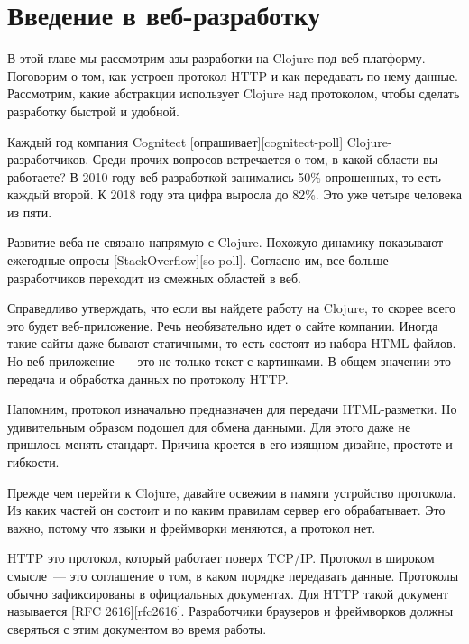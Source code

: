 
\chapter{Введение в веб-разработку}

В этой главе мы рассмотрим азы разработки на Clojure под
веб-платформу. Поговорим о том, как устроен протокол HTTP и как передавать по
нему данные. Рассмотрим, какие абстракции использует Clojure над протоколом,
чтобы сделать разработку быстрой и удобной.


Каждый год компания Cognitect [опрашивает][cognitect-poll]
Clojure-разработчиков. Среди прочих вопросов встречается о том, в какой области
вы работаете? В 2010 году веб-разработкой занимались 50\% опрошенных, то есть
каждый второй. К 2018 году эта цифра выросла до 82\%. Это уже четыре человека из
пяти.


Развитие веба не связано напрямую с Clojure. Похожую динамику показывают
ежегодные опросы [StackOverflow][so-poll]. Согласно им, все больше разработчиков
переходит из смежных областей в веб.

Справедливо утверждать, что если вы найдете работу на Clojure, то скорее всего
это будет веб-приложение. Речь необязательно идет о сайте компании. Иногда такие
сайты даже бывают статичными, то есть состоят из набора HTML-файлов. Но
веб-приложение~--- это не только текст с картинками. В общем значении это передача
и обработка данных по протоколу HTTP.

Напомним, протокол изначально предназначен для передачи HTML-разметки. Но
удивительным образом подошел для обмена данными. Для этого даже не пришлось
менять стандарт. Причина кроется в его изящном дизайне, простоте и гибкости.

Прежде чем перейти к Clojure, давайте освежим в памяти устройство протокола. Из
каких частей он состоит и по каким правилам сервер его обрабатывает. Это важно,
потому что языки и фреймворки меняются, а протокол нет.


HTTP это протокол, который работает поверх TCP/IP. Протокол в широком смысле~---
это соглашение о том, в каком порядке передавать данные. Протоколы обычно
зафиксированы в официальных документах. Для HTTP такой документ называется [RFC
2616][rfc2616]. Разработчики браузеров и фреймворков должны сверяться с этим
документом во время работы.

